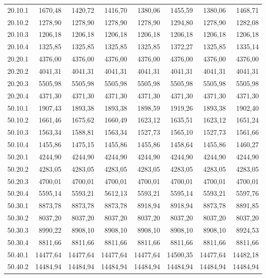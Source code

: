 \documentclass[../DoAn.tex]{subfiles}
\begin{document}
\begin{small}
\begin{longtable}{l|rrrrr|rr}
20.10.1 & 1670,48 & 1420,72 & 1416,70 & 1380,06 & 1455,59 & 1380,06 & 1468,71 \\
20.10.2 & 1278,90 & 1278,90 & 1278,90 & 1278,90 & 1294,80 & 1278,90 & 1282,08 \\
20.10.3 & 1206,18 & 1206,18 & 1206,18 & 1206,18 & 1206,18 & 1206,18 & 1206,18 \\
20.10.4 & 1325,85 & 1325,85 & 1325,85 & 1325,85 & 1372,27 & 1325,85 & 1335,14 \\
20.20.1 & 4376,00 & 4376,00 & 4376,00 & 4376,00 & 4376,00 & 4376,00 & 4376,00 \\
20.20.2 & 4041,31 & 4041,31 & 4041,31 & 4041,31 & 4041,31 & 4041,31 & 4041,31 \\
20.20.3 & 5505,98 & 5505,98 & 5505,98 & 5505,98 & 5505,98 & 5505,98 & 5505,98 \\
20.20.4 & 4371,30 & 4371,30 & 4371,30 & 4371,30 & 4371,30 & 4371,30 & 4371,30 \\
50.10.1 & 1907,43 & 1893,38 & 1893,38 & 1898,59 & 1919,26 & 1893,38 & 1902,40 \\
50.10.2 & 1661,46 & 1675,62 & 1660,49 & 1623,12 & 1635,51 & 1623,12 & 1651,24 \\
50.10.3 & 1563,34 & 1588,81 & 1563,34 & 1527,73 & 1565,10 & 1527,73 & 1561,66 \\
50.10.4 & 1455,86 & 1475,15 & 1455,86 & 1455,86 & 1458,64 & 1455,86 & 1460,27 \\
50.20.1 & 4244,90 & 4244,90 & 4244,90 & 4244,90 & 4244,90 & 4244,90 & 4244,90 \\
50.20.2 & 4283,05 & 4283,05 & 4283,05 & 4283,05 & 4283,05 & 4283,05 & 4283,05 \\
50.20.3 & 4700,01 & 4700,01 & 4700,01 & 4700,01 & 4700,01 & 4700,01 & 4700,01 \\
50.20.4 & 5595,14 & 5593,21 & 5612,13 & 5593,21 & 5595,14 & 5593,21 & 5597,76 \\
50.30.1 & 8873,78 & 8873,78 & 8873,78 & 8918,94 & 8918,94 & 8873,78 & 8891,85 \\
50.30.2 & 8037,20 & 8037,20 & 8037,20 & 8037,20 & 8037,20 & 8037,20 & 8037,20 \\
50.30.3 & 8990,22 & 8908,10 & 8908,10 & 8908,10 & 8908,10 & 8908,10 & 8924,53 \\
50.30.4 & 8811,66 & 8811,66 & 8811,66 & 8811,66 & 8811,66 & 8811,66 & 8811,66 \\
50.40.1 & 14477,64 & 14477,64 & 14477,64 & 14477,64 & 14500,35 & 14477,64 & 14482,18 \\
50.40.2 & 14484,94 & 14484,94 & 14484,94 & 14484,94 & 14484,94 & 14484,94 & 14484,94 \\

\end{longtable}
\end{small}
\end{document}
